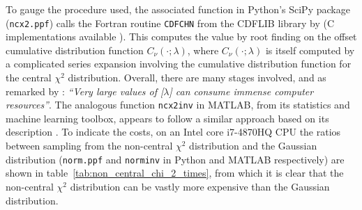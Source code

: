 \documentclass[manuscript,review]{acmart}
\begin{document}
To gauge the procedure used, the associated function in Python's SciPy package (\texttt{ncx2.ppf}) calls the Fortran routine \texttt{CDFCHN} from the CDFLIB library by \citet{brown1994dcdflib} (C implementations available \citep{burkardt2020cdflib}). This computes the value by root finding  \citep[algorithm~R]{bus1975two} on the offset cumulative distribution function $ C_\nu(\cdot;\lambda) $, where $ C_\nu(\cdot;\lambda) $ is itself computed by a complicated series expansion \citep[(26.4.25)]{abramowitz1948handbook} involving the cumulative distribution function for the central $ \chi^2 $ distribution. Overall, there are many stages involved, and as remarked by \citet[\texttt{cdflib.c}]{burkardt2020cdflib}: \textit{``Very large values of
[$ \lambda $] can consume immense computer resources''}. The analogous function \texttt{ncx2inv} in MATLAB, from its statistics and machine learning toolbox, appears to follow a similar approach based on its description \citep[page~4301]{matlab2018statistics}. To indicate the costs, on an Intel core i7-4870HQ CPU the ratios between sampling from the non-central $ \chi^2 $ distribution and the Gaussian distribution (\texttt{norm.ppf} and \texttt{norminv} in Python and MATLAB respectively) are shown in table~\ref{tab:non_central_chi_2_times}, from which it is clear that the non-central $ \chi^2 $ distribution can be vastly more expensive than the Gaussian distribution. 
\end{document}
